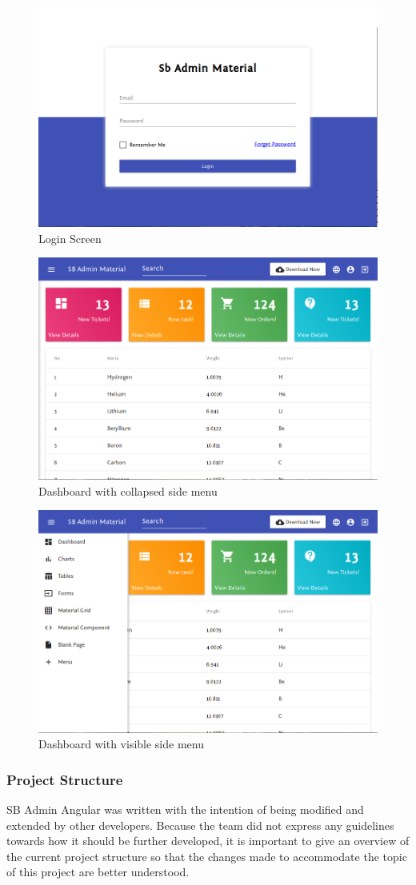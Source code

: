 \begin{figure}
  \centering
  \includegraphics[width=.5\textwidth]{images/sbadmin/login}
  \caption{Login Screen}\label{fig:login}
\end{figure}
\begin{figure}
  \centering
  \includegraphics[width=.5\textwidth]{images/sbadmin/collapsed}
  \caption{Dashboard with collapsed side menu}\label{fig:dash}
\end{figure}
\begin{figure}
  \centering
  \includegraphics[width=.5\textwidth]{images/sbadmin/visible}
  \caption{Dashboard with visible side menu}\label{fig:visible}
\end{figure}

\subsubsection{Project Structure}
SB Admin Angular was written with the intention of being modified and extended by other developers. Because the team did not express any guidelines towards how it should be further developed, it is important to give an overview of the current project structure so that the changes made to accommodate the topic of this project are better understood.

